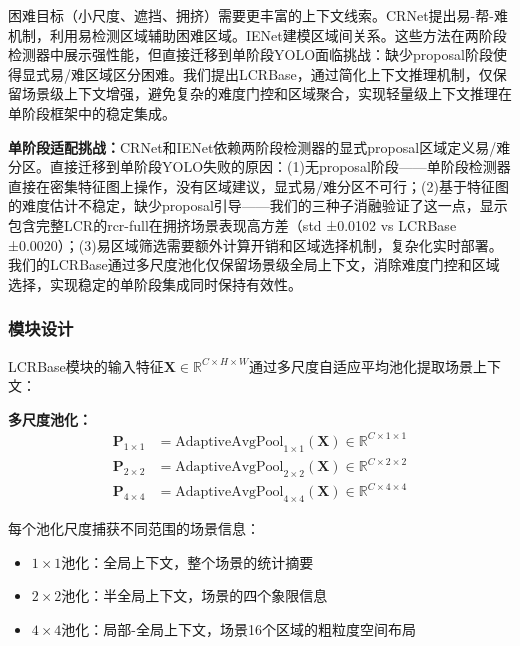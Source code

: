 \documentclass[journal]{IEEEtran}
\begin{document}
困难目标（小尺度、遮挡、拥挤）需要更丰富的上下文线索。CRNet提出易-帮-难机制，利用易检测区域辅助困难区域。IENet建模区域间关系。这些方法在两阶段检测器中展示强性能，但直接迁移到单阶段YOLO面临挑战：缺少proposal阶段使得显式易/难区域区分困难。我们提出LCRBase，通过简化上下文推理机制，仅保留场景级上下文增强，避免复杂的难度门控和区域聚合，实现轻量级上下文推理在单阶段框架中的稳定集成。

\textbf{单阶段适配挑战：}CRNet和IENet依赖两阶段检测器的显式proposal区域定义易/难分区。直接迁移到单阶段YOLO失败的原因：(1)无proposal阶段——单阶段检测器直接在密集特征图上操作，没有区域建议，显式易/难分区不可行；(2)基于特征图的难度估计不稳定，缺少proposal引导——我们的三种子消融验证了这一点，显示包含完整LCR的rcr-full在拥挤场景表现高方差（std ±0.0102 vs LCRBase ±0.0020）；(3)易区域筛选需要额外计算开销和区域选择机制，复杂化实时部署。我们的LCRBase通过多尺度池化仅保留场景级全局上下文，消除难度门控和区域选择，实现稳定的单阶段集成同时保持有效性。

\subsubsection{模块设计}

LCRBase模块的输入特征$\mathbf{X} \in \mathbb{R}^{C \times H \times W}$通过多尺度自适应平均池化提取场景上下文：

\textbf{多尺度池化：}
\begin{equation}
\begin{split}
\mathbf{P}_{1 \times 1} &= \text{AdaptiveAvgPool}_{1 \times 1}(\mathbf{X}) \in \mathbb{R}^{C \times 1 \times 1} \\
\mathbf{P}_{2 \times 2} &= \text{AdaptiveAvgPool}_{2 \times 2}(\mathbf{X}) \in \mathbb{R}^{C \times 2 \times 2} \\
\mathbf{P}_{4 \times 4} &= \text{AdaptiveAvgPool}_{4 \times 4}(\mathbf{X}) \in \mathbb{R}^{C \times 4 \times 4}
\end{split}
\end{equation}

每个池化尺度捕获不同范围的场景信息：
\begin{itemize}
    \item $1 \times 1$池化：全局上下文，整个场景的统计摘要
    \item $2 \times 2$池化：半全局上下文，场景的四个象限信息
    \item $4 \times 4$池化：局部-全局上下文，场景16个区域的粗粒度空间布局
\end{itemize}
\end{document}
